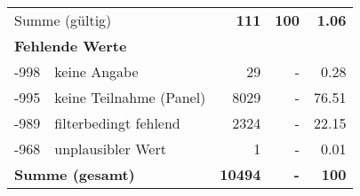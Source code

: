\begin{longtable}{lXrrr}
     \midrule
     \multicolumn{2}{l}{Summe (gültig)} &
       \textbf{\num{111}} &
     \textbf{100} &
       \textbf{\num[round-mode=places,round-precision=2]{1,06}} \\
     \multicolumn{5}{l}{\textbf{Fehlende Werte}}\\
       -998 &
       keine Angabe &
         \num{29} &
        - &
         \num[round-mode=places,round-precision=2]{0,28} \\
       -995 &
       keine Teilnahme (Panel) &
         \num{8029} &
        - &
         \num[round-mode=places,round-precision=2]{76,51} \\
       -989 &
       filterbedingt fehlend &
         \num{2324} &
        - &
         \num[round-mode=places,round-precision=2]{22,15} \\
       -968 &
       unplausibler Wert &
         \num{1} &
        - &
         \num[round-mode=places,round-precision=2]{0,01} \\
     \midrule
     \multicolumn{2}{l}{\textbf{Summe (gesamt)}} &
          \textbf{\num{10494}} &
        \textbf{-} &
        \textbf{100} \\
     \bottomrule
     \end{longtable}
     
